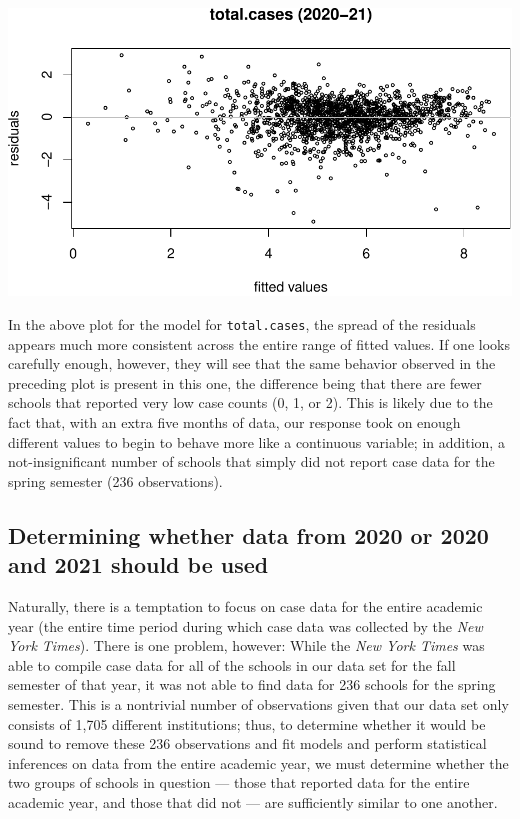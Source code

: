 \documentclass[
]{article}
\begin{document}
\includegraphics{final_files/figure-latex/unnamed-chunk-14-1.pdf}

In the above plot for the model for \texttt{total.cases}, the spread of
the residuals appears much more consistent across the entire range of
fitted values. If one looks carefully enough, however, they will see
that the same behavior observed in the preceding plot is present in this
one, the difference being that there are fewer schools that reported
very low case counts (0, 1, or 2). This is likely due to the fact that,
with an extra five months of data, our response took on enough different
values to begin to behave more like a continuous variable; in addition,
a not-insignificant number of schools that simply did not report case
data for the spring semester (236 observations).

\hypertarget{determining-whether-data-from-2020-or-2020-and-2021-should-be-used}{%
\subsection{Determining whether data from 2020 or 2020 and 2021 should
be
used}\label{determining-whether-data-from-2020-or-2020-and-2021-should-be-used}}

Naturally, there is a temptation to focus on case data for the entire
academic year (the entire time period during which case data was
collected by the \emph{New York Times}). There is one problem, however:
While the \emph{New York Times} was able to compile case data for all of
the schools in our data set for the fall semester of that year, it was
not able to find data for 236 schools for the spring semester. This is a
nontrivial number of observations given that our data set only consists
of 1,705 different institutions; thus, to determine whether it would be
sound to remove these 236 observations and fit models and perform
statistical inferences on data from the entire academic year, we must
determine whether the two groups of schools in question --- those that
reported data for the entire academic year, and those that did not ---
are sufficiently similar to one another.
\end{document}
